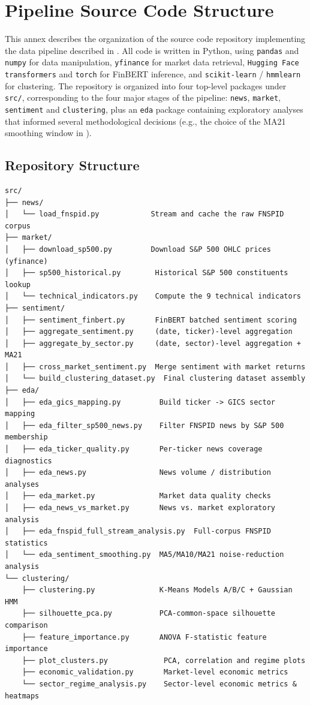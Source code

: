 \chapter{Pipeline Source Code Structure}
\label{annex:pipeline}

This annex describes the organization of the source code repository
implementing the data pipeline described in . All
code is written in Python, using \texttt{pandas} and \texttt{numpy} for
data manipulation, \texttt{yfinance} for market data retrieval,
\texttt{Hugging Face transformers} and \texttt{torch} for FinBERT
inference, and \texttt{scikit-learn} / \texttt{hmmlearn} for clustering.
The repository is organized into four top-level packages under
\texttt{src/}, corresponding to the four major stages of the pipeline:
\texttt{news}, \texttt{market}, \texttt{sentiment} and \texttt{clustering},
plus an \texttt{eda} package containing exploratory analyses that informed
several methodological decisions (e.g., the choice of the MA21 smoothing
window in ).

\section{Repository Structure}
\label{annex:pipeline-structure}

\begin{verbatim}
src/
├── news/
│   └── load_fnspid.py            Stream and cache the raw FNSPID corpus
├── market/
│   ├── download_sp500.py         Download S&P 500 OHLC prices (yfinance)
│   ├── sp500_historical.py        Historical S&P 500 constituents lookup
│   └── technical_indicators.py    Compute the 9 technical indicators
├── sentiment/
│   ├── sentiment_finbert.py       FinBERT batched sentiment scoring
│   ├── aggregate_sentiment.py     (date, ticker)-level aggregation
│   ├── aggregate_by_sector.py     (date, sector)-level aggregation + MA21
│   ├── cross_market_sentiment.py  Merge sentiment with market returns
│   └── build_clustering_dataset.py  Final clustering dataset assembly
├── eda/
│   ├── eda_gics_mapping.py         Build ticker -> GICS sector mapping
│   ├── eda_filter_sp500_news.py    Filter FNSPID news by S&P 500 membership
│   ├── eda_ticker_quality.py       Per-ticker news coverage diagnostics
│   ├── eda_news.py                 News volume / distribution analyses
│   ├── eda_market.py               Market data quality checks
│   ├── eda_news_vs_market.py       News vs. market exploratory analysis
│   ├── eda_fnspid_full_stream_analysis.py  Full-corpus FNSPID statistics
│   └── eda_sentiment_smoothing.py  MA5/MA10/MA21 noise-reduction analysis
└── clustering/
    ├── clustering.py               K-Means Models A/B/C + Gaussian HMM
    ├── silhouette_pca.py           PCA-common-space silhouette comparison
    ├── feature_importance.py       ANOVA F-statistic feature importance
    ├── plot_clusters.py             PCA, correlation and regime plots
    ├── economic_validation.py       Market-level economic metrics
    └── sector_regime_analysis.py    Sector-level economic metrics & heatmaps
\end{verbatim}

